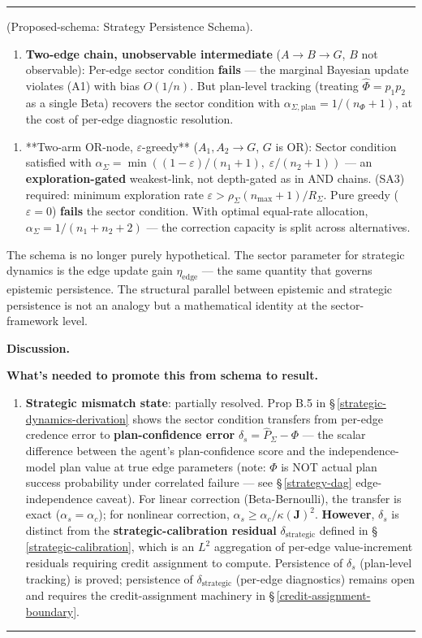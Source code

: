 \documentclass[11pt,oneside]{article}
\newcounter{claim}[section]
\renewcommand{\theclaim}{\thesection.\arabic{claim}}
\newenvironment{segment}[2]{%
  \refstepcounter{claim}%
  \bigskip\noindent\hrule\smallskip
  \noindent{\bfseries #1~\theclaim}\enskip(#2).\par\smallskip
  \noindent\ignorespaces
}{%
  \par\smallskip\noindent\hrule\bigskip
}
\newenvironment{remark}[1][]{\begin{segment}{Remark}{#1}}{\end{segment}}
\begin{document}
\begin{remark}[Proposed-schema: Strategy Persistence Schema]
\begin{enumerate}
  \item \textbf{Two-edge chain, unobservable intermediate} ($A \to B \to G$, $B$ not observable): Per-edge sector condition \textbf{fails} — the marginal Bayesian update violates (A1) with bias $O(1/n)$. But plan-level tracking (treating $\hat{\Phi} = p_1 p_2$ as a single Beta) recovers the sector condition with $\alpha_{\Sigma,\text{plan}} = 1/(n_\Phi + 1)$, at the cost of per-edge diagnostic resolution.
\end{enumerate}


\begin{enumerate}
  \item **Two-arm OR-node, $\varepsilon$-greedy** ($A_1, A_2 \to G$, $G$ is OR): Sector condition satisfied with $\alpha_\Sigma = \min((1-\varepsilon)/(n_1+1),\; \varepsilon/(n_2+1))$ — an \textbf{exploration-gated} weakest-link, not depth-gated as in AND chains. (SA3) required: minimum exploration rate $\varepsilon > \rho_\Sigma(n_{\max}+1)/R_\Sigma$. Pure greedy ($\varepsilon = 0$) \textbf{fails} the sector condition. With optimal equal-rate allocation, $\alpha_\Sigma = 1/(n_1 + n_2 + 2)$ — the correction capacity is split across alternatives.
\end{enumerate}


The schema is no longer purely hypothetical. The sector parameter for strategic dynamics is the edge update gain $\eta_{\text{edge}}$ — the same quantity that governs epistemic persistence. The structural parallel between epistemic and strategic persistence is not an analogy but a mathematical identity at the sector-framework level.


\medskip\noindent\textbf{Discussion.}


\textbf{What's needed to promote this from schema to result.}

\begin{enumerate}
  \item \textbf{Strategic mismatch state}: partially resolved. Prop B.5 in \S\,\ref{strategic-dynamics-derivation} shows the sector condition transfers from per-edge credence error to \textbf{plan-confidence error} $\delta_s = \hat P_\Sigma - \Phi$ — the scalar difference between the agent's plan-confidence score and the independence-model plan value at true edge parameters (note: $\Phi$ is NOT actual plan success probability under correlated failure — see \S\,\ref{strategy-dag} edge-independence caveat). For linear correction (Beta-Bernoulli), the transfer is exact ($\alpha_s = \alpha_c$); for nonlinear correction, $\alpha_s \geq \alpha_c / \kappa(\mathbf{J})^2$. \textbf{However}, $\delta_s$ is distinct from the \textbf{strategic-calibration residual} $\delta_{\text{strategic}}$ defined in \S\,\ref{strategic-calibration}, which is an $L^2$ aggregation of per-edge value-increment residuals requiring credit assignment to compute. Persistence of $\delta_s$ (plan-level tracking) is proved; persistence of $\delta_{\text{strategic}}$ (per-edge diagnostics) remains open and requires the credit-assignment machinery in \S\,\ref{credit-assignment-boundary}.
\end{enumerate}



\end{remark}
\end{document}
